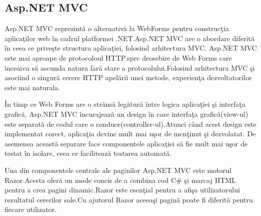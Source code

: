 \documentclass[a4paper,12pt]{report}
\begin{document}
\subsection{Asp.NET MVC}
Asp.NET MVC reprezint\u a o alternativ\u a la WebForms pentru construc\c tia aplica\c tilor web \^in cadrul
platformei .NET.Asp.NET MVC are o abordare diferit\u a \^in ceea ce prive\c ste structura aplica\c tiei, folosind
arhitectura MVC.
Asp.NET MVC este mai aproape de protocoloul HTTP.spre deosebire de Web Forms care \^incearca s\u a ascunda 
natura far\u a stare a protocolului.Folosind arhitectura MVC \c si asociind o singur\u a cerere HTTP apel\u arii 
unei metode, experien\c ta dezvoltatorilor este mai naturala.

\^In timp ce Web Forms are o str\^ans\u a leg\u atur\u a \^intre logica aplica\c tiei \c si interfa\c ta grafic\u a,
Asp.NET MVC \^incurajeaz\u a un design \^in care interfa\c ta grafic\u a(view-ul) este separat\u a de codul
care o conduce(controller-ul).Atunci c\^and acest design este implementat corect, aplica\c tia devine mult mai u\c sor de men\c tinut
\c si dezvolatat.
De asemenea aceast\u a separare face componentele aplica\c tiei s\u a fie mult mai u\c sor de testat \^in isolare,
ceea ce faciliteaz\u a testarea automat\u a.

Una din componentele centrale ale paginilor Asp.NET MVC este motorul Razor.Acesta ofer\u a un mode concis
de a combina cod C\# \c si marcaj HTML pentru a crea pagini dinamic.Razor este esen\c tial pentru a afi\c sa 
utilizatorului rezultatul cererilor sale.Cu ajutorul Razor aceea\c si pagin\u a poate fi diferit\u a pentru 
fiecare utilizator.
\end{document}
